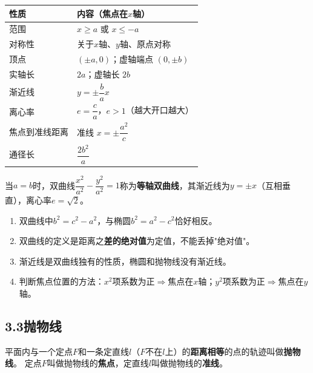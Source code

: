 \documentclass[12pt, a4paper]{ctexart}
\begin{document}
\begin{knowledgebox}[几何性质]
\renewcommand{\arraystretch}{1.4}
\begin{center}
\begin{tabular}{|l|l|}
\hline
\textbf{性质} & \textbf{内容（焦点在$x$轴）} \\
\hline
范围 & $x \geqslant a$ 或 $x \leqslant -a$ \\
\hline
对称性 & 关于$x$轴、$y$轴、原点对称 \\
\hline
顶点 & $(\pm a, 0)$；虚轴端点 $(0, \pm b)$ \\
\hline
实轴长 & $2a$；虚轴长 $2b$ \\
\hline
渐近线 & $y = \pm\dfrac{b}{a}x$ \\
\hline
离心率 & $e = \dfrac{c}{a}$，$e > 1$（越大开口越大） \\
\hline
焦点到准线距离 & 准线 $x = \pm\dfrac{a^2}{c}$ \\
\hline
通径长 & $\dfrac{2b^2}{a}$ \\
\hline
\end{tabular}
\end{center}
\end{knowledgebox}

\begin{tipbox}[等轴双曲线]
当$a = b$时，双曲线$\dfrac{x^2}{a^2} - \dfrac{y^2}{a^2} = 1$称为\textbf{等轴双曲线}，其渐近线为$y = \pm x$（互相垂直），离心率$e = \sqrt{2}$。
\end{tipbox}

\begin{warnbox}[易错提醒]
\begin{enumerate}[leftmargin=1.5em]
  \item 双曲线中$b^2 = c^2 - a^2$，与椭圆$b^2 = a^2 - c^2$恰好相反。
  \item 双曲线的定义是距离之\textbf{差的绝对值}为定值，不能丢掉"绝对值"。
  \item 渐近线是双曲线独有的性质，椭圆和抛物线没有渐近线。
  \item 判断焦点位置的方法：$x^2$项系数为正$\Rightarrow$焦点在$x$轴；$y^2$项系数为正$\Rightarrow$焦点在$y$轴。
\end{enumerate}
\end{warnbox}

\subsection*{3.3\quad 抛物线}

\begin{knowledgebox}[定义]
平面内与一个定点$F$和一条定直线$l$（$F$不在$l$上）的\textbf{距离相等}的点的轨迹叫做\textbf{抛物线}。
定点$F$叫做抛物线的\textbf{焦点}，定直线$l$叫做抛物线的\textbf{准线}。
\end{knowledgebox}
\end{document}
